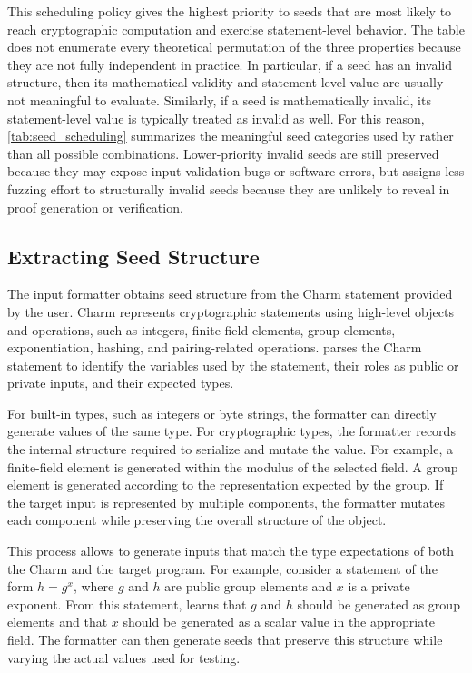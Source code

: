 This scheduling policy gives the highest priority to seeds that are most likely to reach cryptographic computation and exercise statement-level behavior. The table does not enumerate every theoretical permutation of the three properties because they are not fully independent in practice. In particular, if a seed has an invalid structure, then its mathematical validity and statement-level value are usually not meaningful to evaluate. Similarly, if a seed is mathematically invalid, its statement-level value is typically treated as invalid as well. For this reason, \autoref{tab:seed_scheduling} summarizes the meaningful seed categories used by \greyboxfuzz rather than all possible combinations. Lower-priority invalid seeds are still preserved because they may expose input-validation bugs or software errors, but \greyboxfuzz assigns less fuzzing effort to structurally invalid seeds because they are unlikely to reveal \logicerror in proof generation or verification.

\subsection{Extracting Seed Structure}

The input formatter obtains seed structure from the Charm statement provided by the user. Charm represents cryptographic statements using high-level objects and operations, such as integers, finite-field elements, group elements, exponentiation, hashing, and pairing-related operations. \greyboxfuzz parses the Charm statement to identify the variables used by the statement, their roles as public or private inputs, and their expected types.

For built-in types, such as integers or byte strings, the formatter can directly generate values of the same type. For cryptographic types, the formatter records the internal structure required to serialize and mutate the value. For example, a finite-field element is generated within the modulus of the selected field. A group element is generated according to the representation expected by the group. If the target input is represented by multiple components, the formatter mutates each component while preserving the overall structure of the object.

This process allows \greyboxfuzz to generate inputs that match the type expectations of both the Charm and the target \zksnark program. For example, consider a statement of the form \(h = g^x\), where \(g\) and \(h\) are public group elements and \(x\) is a private exponent. From this statement, \greyboxfuzz learns that \(g\) and \(h\) should be generated as group elements and that \(x\) should be generated as a scalar value in the appropriate field. The formatter can then generate seeds that preserve this structure while varying the actual values used for testing.

